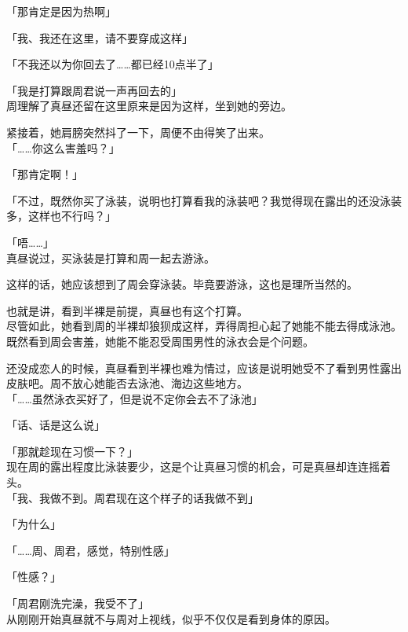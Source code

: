 「那肯定是因为热啊」

「我、我还在这里，请不要穿成这样」

「不我还以为你回去了……都已经10点半了」

「我是打算跟周君说一声再回去的」\\

周理解了真昼还留在这里原来是因为这样，坐到她的旁边。

紧接着，她肩膀突然抖了一下，周便不由得笑了出来。\\

「……你这么害羞吗？」

「那肯定啊！」

「不过，既然你买了泳装，说明也打算看我的泳装吧？我觉得现在露出的还没泳装多，这样也不行吗？」

「唔……」\\

真昼说过，买泳装是打算和周一起去游泳。

这样的话，她应该想到了周会穿泳装。毕竟要游泳，这也是理所当然的。

也就是讲，看到半裸是前提，真昼也有这个打算。\\

尽管如此，她看到周的半裸却狼狈成这样，弄得周担心起了她能不能去得成泳池。\\

既然看到周会害羞，她能不能忍受周围男性的泳衣会是个问题。

还没成恋人的时候，真昼看到半裸也难为情过，应该是说明她受不了看到男性露出皮肤吧。周不放心她能否去泳池、海边这些地方。\\

「……虽然泳衣买好了，但是说不定你会去不了泳池」

「话、话是这么说」

「那就趁现在习惯一下？」\\

现在周的露出程度比泳装要少，这是个让真昼习惯的机会，可是真昼却连连摇着头。\\

「我、我做不到。周君现在这个样子的话我做不到」

「为什么」

「……周、周君，感觉，特别性感」

「性感？」

「周君刚洗完澡，我受不了」\\

从刚刚开始真昼就不与周对上视线，似乎不仅仅是看到身体的原因。\\

